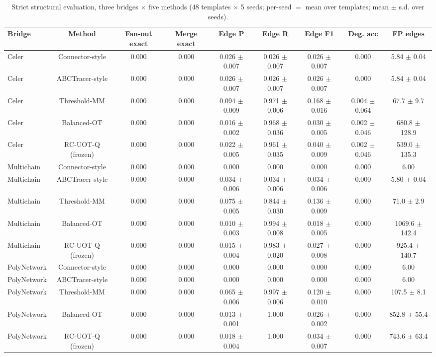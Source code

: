\begin{table}[!t]
\caption{Strict structural evaluation, three bridges $\times$ five methods (48 templates $\times$ 5 seeds; per-seed $=$ mean over templates; mean $\pm$ s.d. over seeds).}
\label{tab:strict}
\centering
\footnotesize
\setlength{\tabcolsep}{4pt}
\begin{tabular}{lcccccccc}
\toprule
Bridge & Method & Fan-out exact & Merge exact & Edge P & Edge R & Edge F1 & Deg. acc & FP edges \\
\midrule
Celer & Connector-style & 0.000 & 0.000 & 0.026 $\pm$ 0.007 & 0.026 $\pm$ 0.007 & 0.026 $\pm$ 0.007 & 0.000 & 5.84 $\pm$ 0.04 \\
Celer & ABCTracer-style & 0.000 & 0.000 & 0.026 $\pm$ 0.007 & 0.026 $\pm$ 0.007 & 0.026 $\pm$ 0.007 & 0.000 & 5.84 $\pm$ 0.04 \\
Celer & Threshold-MM & 0.000 & 0.000 & 0.094 $\pm$ 0.009 & 0.971 $\pm$ 0.006 & 0.168 $\pm$ 0.016 & 0.004 $\pm$ 0.064 & 67.7 $\pm$ 9.7 \\
Celer & Balanced-OT & 0.000 & 0.000 & 0.016 $\pm$ 0.002 & 0.968 $\pm$ 0.036 & 0.030 $\pm$ 0.005 & 0.002 $\pm$ 0.046 & 680.8 $\pm$ 128.9 \\
Celer & RC-UOT-Q (frozen) & 0.000 & 0.000 & 0.022 $\pm$ 0.005 & 0.961 $\pm$ 0.035 & 0.040 $\pm$ 0.009 & 0.002 $\pm$ 0.046 & 539.0 $\pm$ 135.3 \\
Multichain & Connector-style & 0.000 & 0.000 & 0.000 & 0.000 & 0.000 & 0.000 & 6.00 \\
Multichain & ABCTracer-style & 0.000 & 0.000 & 0.034 $\pm$ 0.006 & 0.034 $\pm$ 0.006 & 0.034 $\pm$ 0.006 & 0.000 & 5.80 $\pm$ 0.04 \\
Multichain & Threshold-MM & 0.000 & 0.000 & 0.075 $\pm$ 0.005 & 0.844 $\pm$ 0.030 & 0.136 $\pm$ 0.009 & 0.000 & 71.0 $\pm$ 2.9 \\
Multichain & Balanced-OT & 0.000 & 0.000 & 0.010 $\pm$ 0.003 & 0.994 $\pm$ 0.008 & 0.018 $\pm$ 0.005 & 0.000 & 1069.6 $\pm$ 142.4 \\
Multichain & RC-UOT-Q (frozen) & 0.000 & 0.000 & 0.015 $\pm$ 0.004 & 0.983 $\pm$ 0.020 & 0.027 $\pm$ 0.008 & 0.000 & 925.4 $\pm$ 140.7 \\
PolyNetwork & Connector-style & 0.000 & 0.000 & 0.000 & 0.000 & 0.000 & 0.000 & 6.00 \\
PolyNetwork & ABCTracer-style & 0.000 & 0.000 & 0.000 & 0.000 & 0.000 & 0.000 & 6.00 \\
PolyNetwork & Threshold-MM & 0.000 & 0.000 & 0.065 $\pm$ 0.006 & 0.997 $\pm$ 0.006 & 0.120 $\pm$ 0.010 & 0.000 & 107.5 $\pm$ 8.1 \\
PolyNetwork & Balanced-OT & 0.000 & 0.000 & 0.013 $\pm$ 0.001 & 1.000 & 0.026 $\pm$ 0.002 & 0.000 & 852.8 $\pm$ 55.4 \\
PolyNetwork & RC-UOT-Q (frozen) & 0.000 & 0.000 & 0.018 $\pm$ 0.004 & 1.000 & 0.034 $\pm$ 0.007 & 0.000 & 743.6 $\pm$ 63.4 \\
\bottomrule
\end{tabular}
\end{table}

